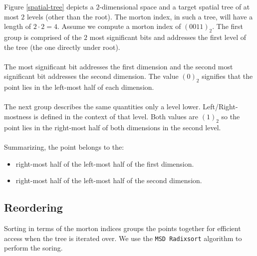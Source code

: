 \documentclass{juliacon}
\begin{document}
\begin{example}
  Figure \ref{spatial-tree} depicts a $2$-dimensional space and a target spatial
  tree of at most $2$ levels (other than the root). The morton index, in such a tree,
  will have a length of $2\cdot2=4$. Assume we compute a morton index of $(0011)_2$.
  The first group is comprised of the $2$ most significant bits and addresses the first
  level of the tree (the one directly under root).
  \\\\
  The most significant bit addresses the first dimension and the second most significant
  bit addresses the second dimension. The value $(0)_2$ signifies that the point lies in
  the left-most half of each dimension.
  \\\\
  The next group describes the same quantities only a level lower. Left/Right-mostness
  is defined in the context of that level. Both values are $(1)_2$ so the point lies in
  the right-most half of both dimensions in the second level.
  \\\\
  Summarizing, the point belongs to the:
  \begin{itemize}
    \item right-most half of the left-most half of the first dimension.
    \item right-most half of the left-most half of the second dimension.
  \end{itemize}

\end{example}

\subsection{Reordering}
Sorting in terms of the morton indices groups the points together for efficient access
when the tree is iterated over. We use the \verb|MSD Radixsort| algorithm to perform the
soring.
\end{document}
